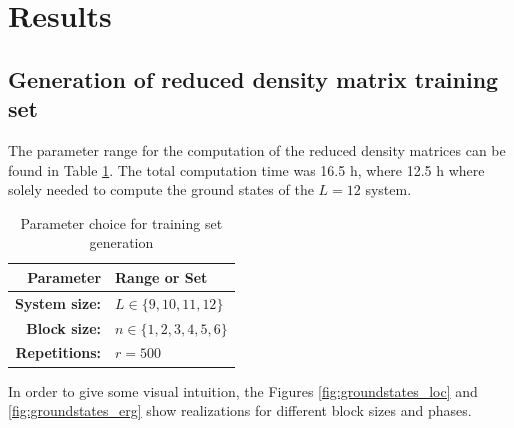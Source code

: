 \documentclass[reprint,amsmath,amssymb,aps,prb]{revtex4-2}
\begin{document}
\section{Results}

\subsection{Generation of reduced density matrix training set}

The parameter range for the computation of the reduced density matrices can be found in Table \ref{tab:par_train}. The total computation time was 16.5 h, where 12.5 h where solely needed to compute the ground states of the $L=12$ system.

\begin{table}[h!]
	\centering
	\begin{tabular}{rl}
		\hline
		Parameter & Range or Set \\
		\hline
		\hline 
	\textbf{System size:} & $L \in \{9, 10, 11, 12\}$ \\ 
		\textbf{Block size:} & $n \in \{1, 2, 3, 4, 5, 6\}$ \\ 
		\textbf{Repetitions:} & $r=500$\\
		\hline
	\end{tabular} 
	\caption{Parameter choice for training set generation}\label{tab:par_train}
\end{table}%

In order to give some visual intuition, the Figures \ref{fig:groundstates_loc} and \ref{fig:groundstates_erg} show realizations for different block sizes and phases.
\end{document}
